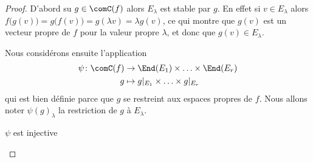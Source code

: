 \begin{proof}
    D'abord su \( g\in\comC(f)\) alors \( E_{\lambda}\) est stable par \( g\). En effet si \( v\in E_{\lambda}\) alors \( f\big( g(v) \big)=g\big( f(v) \big)=g(\lambda v)=\lambda g(v)\), ce qui montre que \( g(v)\) est un vecteur propre de \( f\) pour la valeur propre \( \lambda\), et donc que \( g(v)\in E_{\lambda}\).

    Nous considérons ensuite l'application
    \begin{equation}
        \begin{aligned}
            \psi\colon \comC(f)&\to \End(E_1)\times \ldots\times \End(E_r) \\
            g&\mapsto  g|_{E_1}\times \ldots\times g|_{E_r}
        \end{aligned}
    \end{equation}
    qui est bien définie parce que \( g\) se restreint aux espaces propres de \( f\). Nous allons noter \( \psi(g)_{\lambda}\) la restriction de \( g\) à \( E_{\lambda}\).
    \begin{subproof}
    \item[\( \psi\) est injective]


\end{subproof}
\end{proof}
